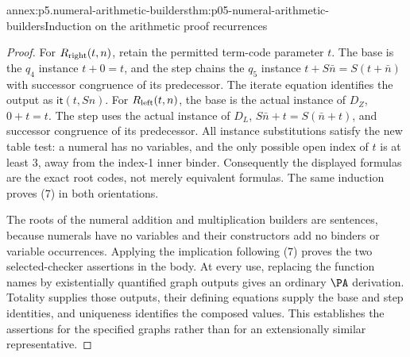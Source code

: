 \begin{annexitem}{annex:p5.numeral-arithmetic-builders}{thm:p05-numeral-arithmetic-builders}{Induction on the arithmetic proof recurrences}
\begin{proof}
For \(R_{\rm right}(t,n)\), retain the permitted term-code parameter
\(t\). The base is the \(q_4\) instance \(t+0=t\), and the step
chains the \(q_5\) instance \(t+S\bar n=S(t+\bar n)\) with successor
congruence of its predecessor. The iterate equation identifies the output
as \(\mathsf{it}(t,Sn)\). For \(R_{\rm left}(t,n)\), the base is
the actual instance of \(D_Z\), \(0+t=t\). The step uses the actual
instance of \(D_L\), \(S\bar n+t=S(\bar n+t)\), and successor
congruence of its predecessor. All instance substitutions satisfy the new
table test: a numeral has no variables, and the only possible open index
of \(t\) is at least 3, away from the index-1 inner binder. Consequently
the displayed formulas are the exact root codes, not merely equivalent
formulas. The same induction proves (7) in both orientations.

The roots of the numeral addition and multiplication builders are sentences,
because numerals have no variables and their constructors add no binders or
variable occurrences. Applying the implication following (7) proves the
two selected-checker assertions in the body. At every use, replacing the
function names by existentially quantified graph outputs gives an ordinary
\(\PA\) derivation. Totality supplies those outputs, their defining
equations supply the base and step identities, and uniqueness identifies
the composed values. This establishes the assertions for the specified
graphs rather than for an extensionally similar representative.
\end{proof}
\end{annexitem}

